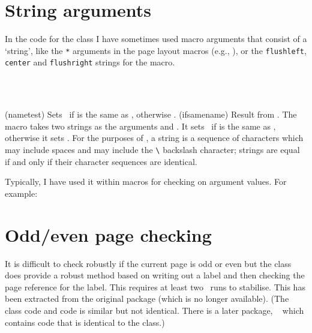 \section{String arguments}

    In the code for the class I have sometimes used macro arguments
that consist of a `string', like the \texttt{*} arguments in the page layout
macros (e.g., \cmd{\settypeblocksize}), or the \texttt{flushleft}, 
\texttt{center} and \texttt{flushright} strings for the 
\cmd{\makeheadposition} macro.

\begin{syntax}
\cmd{\nametest} \\
 \\
\end{syntax}
\glossary(nametest)%
  {}%
  {Sets  \ptrue\ if  is the same as ,
  otherwise \pfalse.}
\glossary(ifsamename)%
  {}%
  {Result from .}
The macro \cmd{\nametest} takes two strings 
as the arguments  and . It sets 
\ptrue\ if  is the same as , otherwise it sets
 \pfalse. For the purposes of \cmd{\nametest}, a string is a
sequence of characters which may include spaces and may include
the \verb?\? backslash character; strings are equal if and only if their
character sequences are identical.

    Typically, I have used it within macros for checking on argument
values. For example:
\begin{lcode}
\newcommand{\amacro}[1]{%
  \nametest{#1}{green}
  \ifsamename
  \fi
  \nametest{#1}{red}
  \ifsamename
  \fi
  ...
}
\end{lcode}

\section{Odd/even page checking}

It is difficult to check robustly if the current page is odd or even
but the class does provide a robust method based on writing out a
label and then checking the page reference for the label. This
requires at least two \ltx\ runs to stabilise. This has been extracted
from the original  package (which is no longer
available). (The class code and  code is similar but
not identical. There is a later package,
~\cite{CHANGEPAGE} which contains code that is
identical to the class.)


